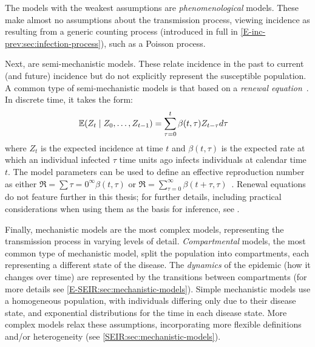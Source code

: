 \documentclass[thesis.tex]{subfiles}
\begin{document}
The models with the weakest assumptions are \emph{phenomenological} models.
These make almost no assumptions about the transmission process, viewing incidence as resulting from a generic counting process (introduced in full in \cref{E-inc-prev:sec:infection-process}), such as a Poisson process.

Next, are semi-mechanistic models.
These relate incidence in the past to current (and future) incidence but do not explicitly represent the susceptible population.
A common type of semi-mechanistic models is that based on a \emph{renewal equation}~\autocite{bhattSemimechanistic,fraserRenewal}.
In discrete time, it takes the form:
\begin{align}
    \operatorname{\mathbb{E}}(Z_t \mid Z_0, \dots, Z_{t-1}) &= \sum_{\tau=0}^t \beta(t,\tau) Z_{t-\tau} d \tau
    \label{intro:eq:renewal}
\end{align}
where $Z_t$ is the expected incidence at time $t$ and $\beta(t, \tau)$ is the expected rate at which an individual infected $\tau$ time units ago infects individuals at calendar time $t$.
The model parameters can be used to define an effective reproduction number as either $\Re = \sum{\tau=0}^\infty \beta(t, \tau)$ or $\Re = \sum_{\tau=0}^\infty \beta(t+\tau, \tau)$~\autocite{gosticPractical}.
Renewal equations do not feature further in this thesis; for further details, including practical considerations when using them as the basis for inference, see \textcite{thompsonImproved,gosticPractical}.

Finally, mechanistic models are the most complex models, representing the transmission process in varying levels of detail.
\emph{Compartmental} models, the most common type of mechanistic model, split the population into compartments, each representing a different state of the disease.
The \emph{dynamics} of the epidemic (how it changes over time) are represented by the transitions between compartments (for more details see \cref{E-SEIR:sec:mechanistic-models}).
Simple mechanistic models use a homogeneous population, with individuals differing only due to their disease state, and exponential distributions for the time in each disease state.
More complex models relax these assumptions, incorporating more flexible definitions and/or heterogeneity (see \cref{SEIR:sec:mechanistic-models}).
\end{document}
